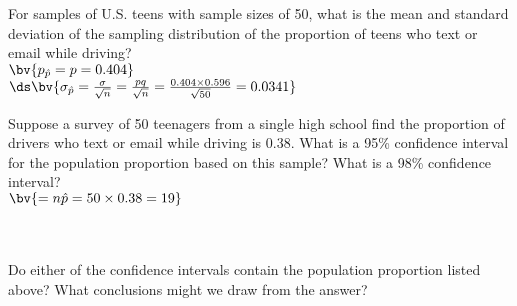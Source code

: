 \documentclass{article}
\begin{document}
\begin{flushleft}
\begin{enumalpha}
\item For samples of U.S. teens with sample sizes of 50, what is the mean and standard deviation of the sampling distribution of the proportion of teens who text or email while driving?\\
\medskip
$\bv{p_{\hat p} = p = 0.404}$\\
\smallskip
$\ds \bv{\sigma_{\hat p} = \frac {\sigma}{\sqrt{n}} = \frac{pq}{\sqrt n} = \frac {0.404 \times 0.596}{\sqrt{50}} = 0.0341}$

\vspace{0.5in}

\item Suppose a survey of 50 teenagers from a single high school find the proportion of drivers who text or email while driving is 0.38. What is a 95\% confidence interval for the population proportion based on this sample? What is a 98\% confidence interval? \\
\medskip
{}$\bv{= n \hat p = 50 \times 0.38 = 19}$\\
\medskip 
{}\\
\medskip 
{}\\


\vspace{0.5in}
\item Do either of the confidence intervals contain the population proportion listed above? What conclusions might we draw from the answer?\\
\medskip


\end{enumalpha}

\end{flushleft}
\end{document}
